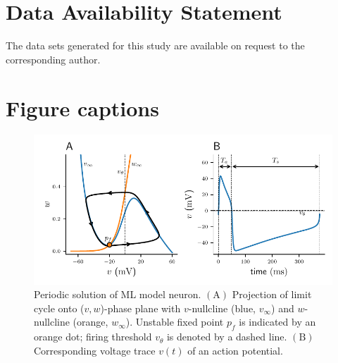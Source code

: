 \documentclass[utf8]{frontiersFPHY} %
\begin{document}
\section*{Data Availability Statement}
The data sets generated for this study are available on request to the corresponding author.




\section*{Figure captions}

\begin{figure}[h!]
	\centering
	\includegraphics{nullclines}
	\caption{Periodic solution of ML model neuron.
		$\bm{\mathrm{(A)}}$
		Projection of limit cycle onto ($v,w$)-phase plane with $v$-nullcline (blue,
		$v_\infty$) and $w$-nullcline (orange, $w_\infty$). Unstable fixed point $p_{f}$
		is indicated by an orange dot; firing threshold $v_{\theta}$ is denoted by a dashed line.
		$\bm{\mathrm{(B)}}$ Corresponding voltage trace $v(t)$ of an action potential.~\label{fig:nullclines}}
\end{figure}
\end{document}
